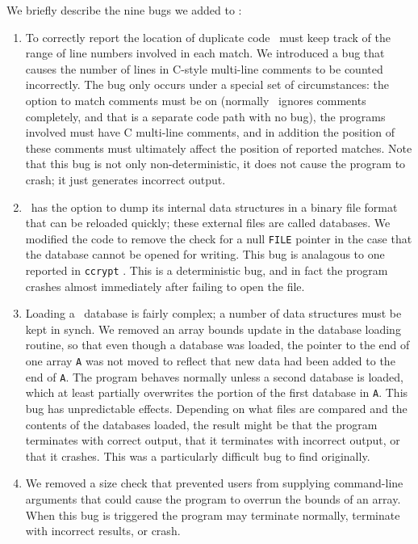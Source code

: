 We briefly describe the nine bugs we added to \moss:
\begin{enumerate}
\item To correctly report the location of duplicate code \moss\ must
keep track of the range of line numbers involved in each match.  We
introduced a bug that causes the number of lines in C-style multi-line
comments to be counted incorrectly.  The bug only occurs under a
special set of circumstances: the option to match comments must be on
(normally \moss\ ignores comments completely, and that is a separate
code path with no bug), the programs involved must have C multi-line
comments, and in addition the position of these comments must
ultimately affect the position of reported matches.  Note that this
bug is not only non-deterministic, it does not cause the program to
crash; it just generates incorrect output.

\item \moss\ has the option to dump its internal data structures in a
binary file format that can be reloaded quickly; these external files
are called databases.  We modified the code to remove the check for a
null {\tt FILE} pointer in the case that the database cannot be opened
for writing.  This bug is analagous to one reported in {\tt ccrypt}
\cite{ccrypt-reference}.  This is a deterministic bug, and in fact the
program crashes almost immediately after failing to open the file.

\item Loading a \moss\ database is fairly complex; a number of data
structures must be kept in synch.  We removed an array bounds update
in the database loading routine, so that even though a database was
loaded, the pointer to the end of one array {\tt A} was not moved to reflect
that new data had been added to the end of {\tt A}. The program behaves normally
unless a second database is loaded, which at least partially overwrites the
portion of the first database in {\tt A}.  This bug has unpredictable effects.
Depending on what files are compared and the contents of the databases loaded,
the result might be that the program terminates with correct output, that it
terminates with incorrect output, or that it crashes.  This was a particularly
difficult bug to find originally.

\item We removed a size check that prevented users from supplying command-line arguments
that could cause the program to overrun the bounds of an array.  When this bug is triggered
the program may terminate normally, terminate with incorrect results, or crash.



\end{enumerate}

